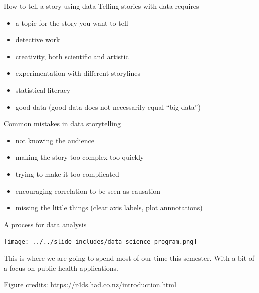 \documentclass[table]{beamer}\usepackage[]{graphicx}\usepackage[]{color}
\begin{document}


\begin{frame}{How to tell a story using data}
Telling stories with data requires
\begin{itemize}
    \item a topic for the story you want to tell
    \item detective work
    \item creativity, both scientific and artistic
    \item experimentation with different storylines
    \item statistical literacy
    \item good data (good data does not necessarily equal ``big data'')
\end{itemize}

\end{frame}



\begin{frame}{Common mistakes in data storytelling}

\begin{itemize}
    \item not knowing the audience
    \item making the story too complex too quickly
    \item trying to make it too complicated
    \item encouraging correlation to be seen as causation
    \item missing the little things (clear axis labels, plot annnotations)
\end{itemize}

\end{frame}




\begin{frame}{A process for data analysis}

\texttt{[image: ../../slide-includes/data-science-program.png]}

\bigskip

This is where we are going to spend most of our time this semester. With a bit of a focus on public health applications.

\bigskip

 \tiny Figure credits: \url{https://r4ds.had.co.nz/introduction.html}

\end{frame}
\end{document}
